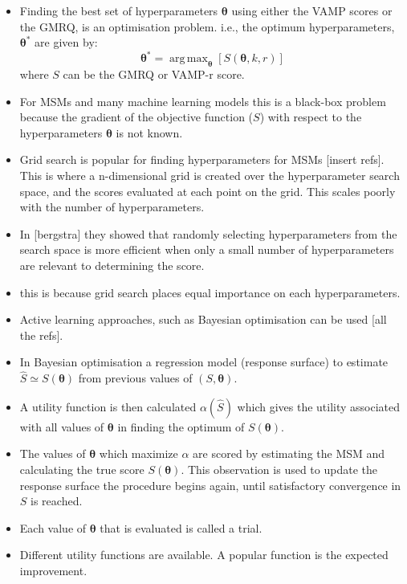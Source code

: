 \documentclass[journal=jacsat,manuscript=article]{achemso}
\DeclareMathOperator*{\argmax}{arg\,max}
\begin{document}
\begin{itemize}
    \item Finding the best set of hyperparameters $\bm{\theta}$ using either the VAMP scores or the GMRQ, is an optimisation problem. i.e., the optimum hyperparameters, $\bm{\theta}^{*}$ are given by:  
    \begin{equation}
        \bm{\theta}^{*} = \argmax_{\bm{\theta}}{[S(\bm{\theta}, k, r)]}
    \end{equation}
    where $S$ can be the GMRQ or VAMP-r score.  
    \item For MSMs and many machine learning models this is a black-box problem because the gradient of the objective function ($S$) with respect to the hyperparameters $\bm{\theta}$ is not known. 
    \item Grid search is popular for finding hyperparameters for MSMs [insert refs]. This is where a n-dimensional grid is created over the hyperparameter search space, and the scores evaluated at each point on the grid. This scales poorly with the number of hyperparameters.    
    \item In [bergstra] they showed that randomly selecting hyperparameters from the search space is more efficient when only a small number of hyperparameters are relevant to determining the score. 
    \item this is because grid search places equal importance on each hyperparameters. 
    \item Active learning approaches, such as Bayesian optimisation can be used [all the refs]. 
    \item In Bayesian optimisation a regression model (response surface) to estimate $\hat{S} \simeq S(\bm{\theta})$ from previous values of $(S, \bm{\theta})$.  
    \item A utility function  is then calculated $\alpha(\hat{S})$ which gives the utility associated with all values of $\bm{\theta}$ in finding the optimum of $S(\bm{\theta})$. 
    \item The values of $\bm{\theta}$ which maximize $\alpha$ are scored by estimating the MSM and calculating the true score $S(\bm{\theta})$. This observation is used to update the response surface the procedure begins again, until satisfactory convergence in $S$ is reached.  
    \item Each value of $\bm{\theta}$ that is evaluated is called a trial. 
    \item Different utility functions are available. A popular function is the expected improvement. 

\end{itemize}
\end{document}
